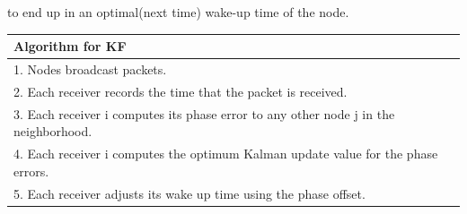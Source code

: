 \documentclass[a4paper,10pt]{report}
\begin{document}
to end up in an optimal(next time) wake-up time of the node.
\newline  \newline
\begin{tabular}{  l }Algorithm for KF \\ \hline
1. Nodes broadcast packets. \\  2. Each receiver records the time that the packet is received. \\
3. Each receiver i computes its phase error to any other node j in the neighborhood. \\
4. Each receiver i computes the optimum Kalman update value for the phase errors. \\
5. Each receiver adjusts its wake up time using the phase offset.\\
\hline
\end{tabular}
\end{document}
